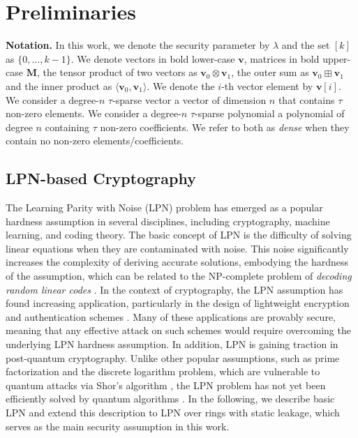 \chapter{Preliminaries}

\textbf{Notation.} In this work, we denote the security parameter by $\lambda$ and the set $[k]$ as $\{0, ..., k-1\}$. We denote vectors in bold lower-case $\mathbf{v}$, matrices in bold upper-case $\mathbf{M}$, the tensor product of two vectors as $\mathbf{v}_0\otimes\mathbf{v}_1$, the outer sum as $\mathbf{v}_0\boxplus\mathbf{v}_1$ and the inner product as $\langle\mathbf{v}_0,\mathbf{v}_1\rangle$. We denote the $i$-th vector element by $\mathbf{v}[i]$. We consider a degree-$n$ $\tau$-sparse vector a vector of dimension $n$ that contains $\tau$ non-zero elements. We consider a degree-$n$ $\tau$-sparse polynomial a polynomial of degree $n$ containing $\tau$ non-zero coefficients. We refer to both as \textit{dense} when they contain no non-zero elements/coefficients.

\section{LPN-based Cryptography}
The Learning Parity with Noise (LPN) problem has emerged as a popular hardness assumption in several disciplines, including cryptography, machine learning, and coding theory. The basic concept of LPN is the difficulty of solving linear equations when they are contaminated with noise. This noise significantly increases the complexity of deriving accurate solutions, embodying the hardness of the assumption, which can be related to the NP-complete problem of \textit{decoding random linear codes} \cite{yu2016pseudorandom}. In the context of cryptography, the LPN assumption has found increasing application, particularly in the design of lightweight encryption and authentication schemes \cite{pietrzak2012cryptography}. Many of these applications are provably secure, meaning that any effective attack on such schemes would require overcoming the underlying LPN hardness assumption. In addition, LPN is gaining traction in post-quantum cryptography. Unlike other popular assumptions, such as prime factorization and the discrete logarithm problem, which are vulnerable to quantum attacks via Shor's algorithm \cite{shor1999polynomial}, the LPN problem has not yet been efficiently solved by quantum algorithms \cite{zhao2018hardness}. 
In the following, we describe basic LPN and extend this description to LPN over rings with static leakage, which serves as the main security assumption in this work.

